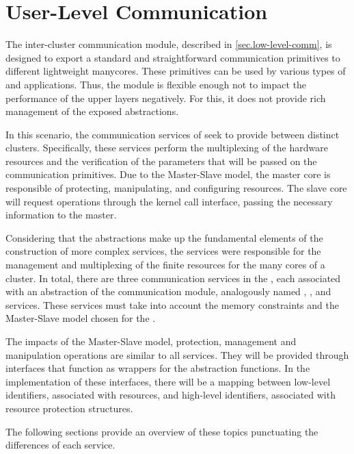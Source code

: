 	\section{User-Level Communication}
	\label{sec.user-level-comm}

		The inter-cluster communication module, described in \autoref{sec.low-level-comm},
		is designed to export a standard and straightforward communication
		primitives to different lightweight manycores.
		These primitives can be used by various types of \oss and applications.
		Thus, the module is flexible enough not to impact the performance
		of the upper layers negatively.
		For this, it does not provide rich management of the exposed abstractions.

		In this scenario, the communication services of \nanvixmicrokernel seek
		to provide \ipc between distinct clusters.
		Specifically, these services perform the multiplexing of the hardware
		resources and the verification of the parameters that will be passed
		on the communication primitives.
		Due to the Master-Slave model, the master core is responsible of protecting,
		manipulating, and configuring \hal resources.
		The slave core will request operations through the kernel call interface,
		passing the necessary information to the master.

		Considering that the abstractions make up the fundamental elements of
		the construction of more complex services, the \nanvixmicrokernel services
		were responsible for the management and multiplexing of the finite
		resources for the many cores of a cluster.
		In total, there are three communication services in the \nanvixmicrokernel,
		each associated with an abstraction of the communication module,
		analogously named \sync, \mailbox, and \portal services.
		These services must take into account the memory constraints and the
		Master-Slave model chosen for the \nanvixmicrokernel.

		The impacts of the Master-Slave model, protection, management and manipulation 
		operations are similar to all services.
		They will be provided through interfaces that function as wrappers
		for the \hal abstraction functions.
		In the implementation of these interfaces, there will be a mapping
		between low-level identifiers, associated with \hal resources,
		and high-level identifiers, associated with resource protection structures.

		The following sections provide an overview of these topics punctuating 
		the differences of each service.

